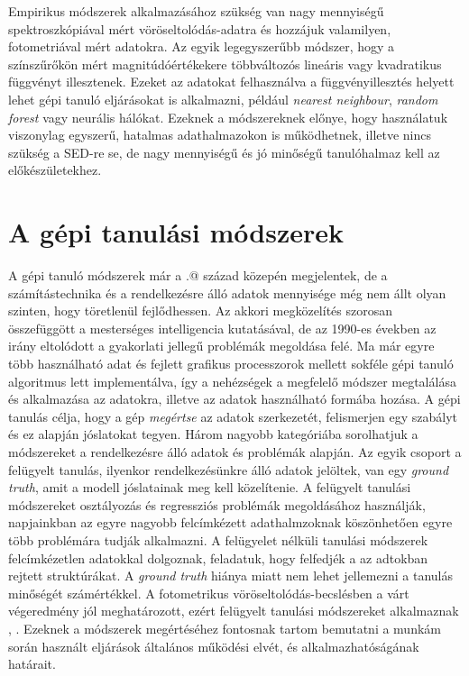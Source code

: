 \documentclass[12pt,letterpaper,oneside,openright]{book}
\makeatletter
\newcommand*{\rom}[1]{\expandafter\@slowromancap\romannumeral #1@}
\makeatother
\begin{document}
\newline \indent
Empirikus módszerek alkalmazásához szükség van nagy mennyiségű spektroszkópiával mért vöröseltolódás-adatra és hozzájuk valamilyen, fotometriával mért adatokra. Az egyik legegyszerűbb módszer, hogy a színszűrőkön mért magnitúdóértékekere többváltozós lineáris vagy kvadratikus függvényt illesztenek\cite{connoly et al}. Ezeket az adatokat felhasználva a függvényillesztés helyett lehet gépi tanuló eljárásokat is alkalmazni, például \textit{nearest neighbour}\cite{app_photoz}, \textit{random forest}\cite{rf} vagy neurális hálókat\cite{mlrsone}.
Ezeknek a módszereknek előnye, hogy használatuk viszonylag egyszerű, hatalmas adathalmazokon is működhetnek, illetve nincs szükség a SED-re se, de nagy mennyiségű és jó minőségű tanulóhalmaz kell az előkészületekhez.

\section{A gépi tanulási módszerek}
A gépi tanuló módszerek már a \rom{20.} század közepén megjelentek, de a számítástechnika és a rendelkezésre álló adatok mennyisége még nem állt olyan szinten, hogy töretlenül fejlődhessen. Az akkori megközelítés szorosan összefüggött a mesterséges intelligencia kutatásával, de az 1990-es években az irány eltolódott a gyakorlati jellegű problémák megoldása felé. Ma már egyre több használható adat és fejlett grafikus processzorok mellett sokféle gépi tanuló algoritmus lett implementálva, így a nehézségek a megfelelő módszer megtalálása és alkalmazása az adatokra, illetve az adatok használható formába hozása. A  gépi tanulás célja, hogy a gép \textit{megértse} az adatok szerkezetét, felismerjen egy szabályt és ez alapján  jóslatokat tegyen. 
\newline \indent
 Három nagyobb kategóriába sorolhatjuk a módszereket a rendelkezésre álló adatok és problémák alapján. Az egyik csoport a felügyelt tanulás, ilyenkor rendelkezésünkre álló adatok jelöltek, van egy \textit{ground truth}, amit a modell jóslatainak meg kell közelítenie. A felügyelt tanulási módszereket osztályozás és regressziós problémák megoldásához használják, napjainkban az egyre nagyobb felcímkézett adathalmzoknak köszönhetően egyre több problémára tudják alkalmazni. A felügyelet nélküli tanulási módszerek felcímkézetlen adatokkal dolgoznak, feladatuk, hogy felfedjék a az adtokban rejtett struktúrákat. A \textit{ground truth} hiánya miatt nem lehet jellemezni a tanulás minőségét számértékkel. 
A fotometrikus vöröseltolódás-becslésben a várt végeredmény jól meghatározott, ezért felügyelt tanulási módszereket alkalmaznak \cite{mlrsone}, \cite{mlrstwo}. Ezeknek a módszerek megértéséhez fontosnak tartom bemutatni a munkám során használt eljárások általános működési elvét, és alkalmazhatóságának határait. 
\end{document}
